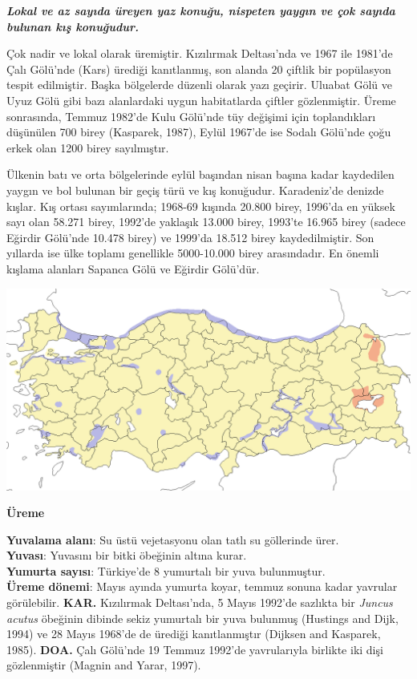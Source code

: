 \documentclass[
  a4paper,
  DIV=11,
  numbers=noendperiod]{scrartcl}
\begin{document}
\textbf{\emph{Lokal ve az sayıda üreyen yaz konuğu, nispeten yaygın ve
çok sayıda bulunan kış konuğudur.}}

Çok nadir ve lokal olarak üremiştir. Kızılırmak Deltası'nda ve 1967 ile
1981'de Çalı Gölü'nde (Kars) ürediği kanıtlanmış, son alanda 20 çiftlik
bir popülasyon tespit edilmiştir. Başka bölgelerde düzenli olarak yazı
geçirir. Uluabat Gölü ve Uyuz Gölü gibi bazı alanlardaki uygun
habitatlarda çiftler gözlenmiştir. Üreme sonrasında, Temmuz 1982'de Kulu
Gölü'nde tüy değişimi için toplandıkları düşünülen 700 birey (Kasparek,
1987), Eylül 1967'de ise Sodalı Gölü'nde çoğu erkek olan 1200 birey
sayılmıştır.

Ülkenin batı ve orta bölgelerinde eylül başından nisan başına kadar
kaydedilen yaygın ve bol bulunan bir geçiş türü ve kış konuğudur.
Karadeniz'de denizde kışlar. Kış ortası sayımlarında; 1968-69 kışında
20.800 birey, 1996'da en yüksek sayı olan 58.271 birey, 1992'de yaklaşık
13.000 birey, 1993'te 16.965 birey (sadece Eğirdir Gölü'nde 10.478
birey) ve 1999'da 18.512 birey kaydedilmiştir. Son yıllarda ise ülke
toplamı genellikle 5000-10.000 birey arasındadır. En önemli kışlama
alanları Sapanca Gölü ve Eğirdir Gölü'dür.

\includegraphics{images/harita_Aythya fuligula.png}

\textbf{Üreme}

\textbf{Yuvalama alanı}: Su üstü vejetasyonu olan tatlı su göllerinde
ürer.\\
\textbf{Yuvası}: Yuvasını bir bitki öbeğinin altına kurar.\\
\textbf{Yumurta sayısı}: Türkiye'de 8 yumurtalı bir yuva bulunmuştur.\\
\textbf{Üreme dönemi}: Mayıs ayında yumurta koyar, temmuz sonuna kadar
yavrular görülebilir. \textbf{KAR.} Kızılırmak Deltası'nda, 5 Mayıs
1992'de sazlıkta bir \emph{Juncus acutus} öbeğinin dibinde sekiz
yumurtalı bir yuva bulunmuş (Hustings and Dijk, 1994) ve 28 Mayıs
1968'de de ürediği kanıtlanmıştır (Dijksen and Kasparek, 1985).
\textbf{DOA.} Çalı Gölü'nde 19 Temmuz 1992'de yavrularıyla birlikte iki
dişi gözlenmiştir (Magnin and Yarar, 1997).
\end{document}
